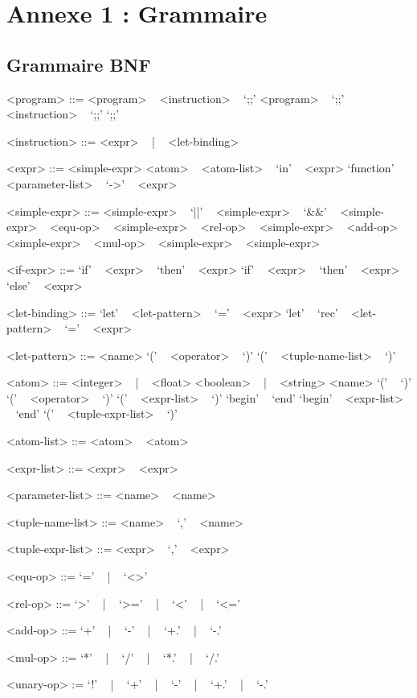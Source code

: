 \documentclass[paper=a4, fontsize=11pt]{scrartcl}
\numberwithin{equation}{section}		%
\numberwithin{figure}{section}			%
\numberwithin{table}{section}				%
\begin{document}
\newpage
\section{Annexe 1 : Grammaire}

\subsection{Grammaire BNF}
\begin{grammar}

<program> ::= <program> ~ <instruction> ~ `;;'
\alt <program> ~ `;;'
\alt <instruction> ~ `;;'
\alt `;;'

<instruction> ::= <expr> ~ | ~ <let-binding>

<expr> ::= <simple-expr>
\alt <atom> ~ <atom-list>
 ~ `in' ~ <expr>
\alt `function' ~ <parameter-list> ~ `->' ~ <expr>

<simple-expr> ::= <simple-expr> ~ `||' ~ <simple-expr>
 ~ `&&' ~ <simple-expr>
 ~ <equ-op> ~ <simple-expr>
 ~ <rel-op> ~ <simple-expr>
 ~ <add-op> ~ <simple-expr>
 ~ <mul-op> ~ <simple-expr>
 ~ <simple-expr>

<if-expr> ::= `if' ~ <expr> ~ `then' ~ <expr>
\alt `if' ~ <expr> ~ `then' ~ <expr> ~ `else' ~ <expr>

<let-binding> ::= `let' ~ <let-pattern> ~ `=' ~ <expr>
\alt `let' ~ `rec' ~ <let-pattern> ~ `=' ~ <expr>

<let-pattern> ::= <name>
\alt `(' ~ <operator> ~ `)'
\alt `(' ~ <tuple-name-list> ~ `)'

<atom> ::= <integer> ~ | ~ <float>
\alt <boolean> ~ | ~ <string>
\alt <name>
\alt `(' ~ `)'
\alt `(' ~ <operator> ~ `)'
\alt `(' ~ <expr-list> ~ `)'
\alt `begin' ~ `end'
\alt `begin' ~ <expr-list> ~ `end'
\alt `(' ~ <tuple-expr-list> ~ `)'

<atom-list> ::= <atom>
 ~ <atom>

<expr-list> ::= <expr>
 ~ <expr>

<parameter-list> ::= <name>
 ~ <name>

<tuple-name-list> ::= <name>
 ~ `,' ~ <name>

<tuple-expr-list> ::= <expr>
 ~ `,' ~ <expr>

<equ-op> ::= `=' ~ | ~ `<>'

<rel-op> ::= `>' ~ | ~ `>=' ~ | ~ `<' ~ | ~ `<='

<add-op> ::= `+' ~ | ~ `-' ~ | ~ `+.' ~ | ~ `-.'

<mul-op> ::= `*' ~ | ~ `/' ~ | ~ `*.' ~ | ~ `/.' 

<unary-op> := `!' ~ | ~ `+' ~ | ~ `-' ~ | ~ `+.' ~ | ~ `-.'

\end{grammar}
\end{document}
